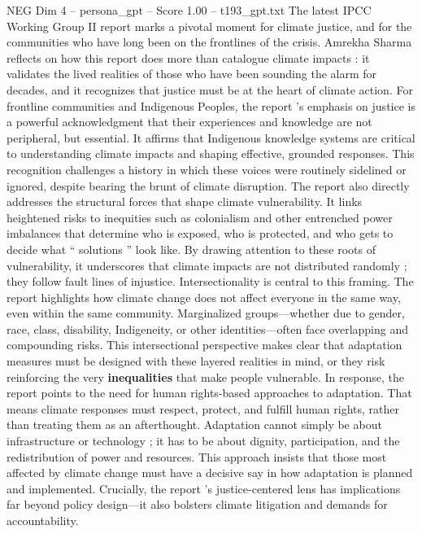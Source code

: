 \begin{textsample}{NEG Dim 4 – persona\_gpt – Score 1.00 – t193\_gpt.txt}  \label{ex:f4_neg_038}
The latest IPCC Working Group II report marks a pivotal moment for climate justice, and for the communities who have long been on the frontlines of the crisis.
Amrekha Sharma reflects on how this report does more than catalogue climate impacts : it validates the lived realities of those who have been sounding the alarm for decades, and it recognizes that justice must be at the heart of climate action.
For frontline communities and Indigenous Peoples, the report ’s emphasis on justice is a powerful acknowledgment that their experiences and knowledge are not peripheral, but essential.
It affirms that Indigenous knowledge systems are critical to understanding climate impacts and shaping effective, grounded responses.
This recognition challenges a history in which these voices were routinely sidelined or ignored, despite bearing the brunt of climate disruption.
The report also directly addresses the structural forces that shape climate vulnerability.
It links heightened risks to inequities such as colonialism and other entrenched power imbalances that determine who is exposed, who is protected, and who gets to decide what “ solutions ” look like.
By drawing attention to these roots of vulnerability, it underscores that climate impacts are not distributed randomly ; they follow fault lines of injustice.
Intersectionality is central to this framing.
The report highlights how climate change does not affect everyone in the same way, even within the same community.
Marginalized groups—whether due to gender, race, class, disability, Indigeneity, or other identities—often face overlapping and compounding risks.
This intersectional perspective makes clear that adaptation measures must be designed with these layered realities in mind, or they risk reinforcing the very \textbf{inequalities} that make people vulnerable.
In response, the report points to the need for human rights-based approaches to adaptation.
That means climate responses must respect, protect, and fulfill human rights, rather than treating them as an afterthought.
Adaptation cannot simply be about infrastructure or technology ; it has to be about dignity, participation, and the redistribution of power and resources.
This approach insists that those most affected by climate change must have a decisive say in how adaptation is planned and implemented.
Crucially, the report ’s justice-centered lens has implications far beyond policy design—it also bolsters climate litigation and demands for accountability.

\end{textsample}
